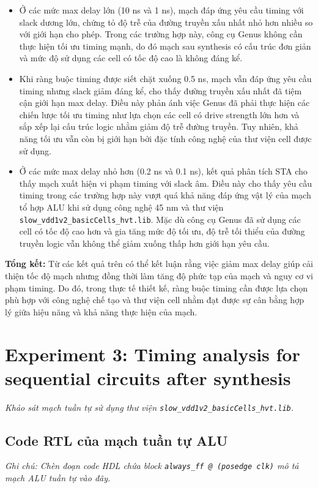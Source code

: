 \documentclass[12pt, a4paper, oneside]{article}
\begin{document}
\begin{itemize}
    \item Ở các mức max delay lớn (10 ns và 1 ns), mạch đáp ứng yêu cầu timing với slack dương lớn, chứng tỏ độ trễ của đường truyền xấu nhất nhỏ hơn nhiều so với giới hạn cho phép. Trong các trường hợp này, công cụ Genus không cần thực hiện tối ưu timing mạnh, do đó mạch sau synthesis có cấu trúc đơn giản và mức độ sử dụng các cell có tốc độ cao là không đáng kể.
    \item Khi ràng buộc timing được siết chặt xuống 0.5 ns, mạch vẫn đáp ứng yêu cầu timing nhưng slack giảm đáng kể, cho thấy đường truyền xấu nhất đã tiệm cận giới hạn max delay. Điều này phản ánh việc Genus đã phải thực hiện các chiến lược tối ưu timing như lựa chọn các cell có drive strength lớn hơn và sắp xếp lại cấu trúc logic nhằm giảm độ trễ đường truyền. Tuy nhiên, khả năng tối ưu vẫn còn bị giới hạn bởi đặc tính công nghệ của thư viện cell được sử dụng.
    \item Ở các mức max delay nhỏ hơn (0.2 ns và 0.1 ns), kết quả phân tích STA cho thấy mạch xuất hiện vi phạm timing với slack âm. Điều này cho thấy yêu cầu timing trong các trường hợp này vượt quá khả năng đáp ứng vật lý của mạch tổ hợp ALU khi sử dụng công nghệ 45 nm và thư viện \texttt{slow\_vdd1v2\_basicCells\_hvt.lib}. Mặc dù công cụ Genus đã sử dụng các cell có tốc độ cao hơn và gia tăng mức độ tối ưu, độ trễ tối thiểu của đường truyền logic vẫn không thể giảm xuống thấp hơn giới hạn yêu cầu.
\end{itemize}

\textbf{Tổng kết:} Từ các kết quả trên có thể kết luận rằng việc giảm max delay giúp cải thiện tốc độ mạch nhưng đồng thời làm tăng độ phức tạp của mạch và nguy cơ vi phạm timing. Do đó, trong thực tế thiết kế, ràng buộc timing cần được lựa chọn phù hợp với công nghệ chế tạo và thư viện cell nhằm đạt được sự cân bằng hợp lý giữa hiệu năng và khả năng thực hiện của mạch.

\newpage
\section{Experiment 3: Timing analysis for sequential circuits after synthesis}
\textit{Khảo sát mạch tuần tự sử dụng thư viện \texttt{slow\_vdd1v2\_basicCells\_hvt.lib}.}

\subsection{Code RTL của mạch tuần tự ALU}
\textit{Ghi chú: Chèn đoạn code HDL chứa block \texttt{always\_ff @ (posedge clk)} mô tả mạch ALU tuần tự vào đây.}
\end{document}
